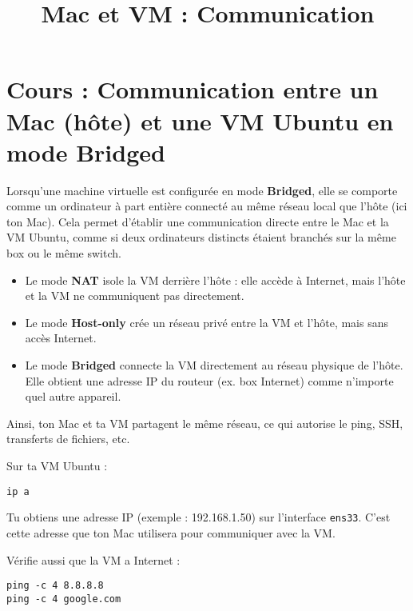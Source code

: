 \documentclass[11pt,a4paper]{article}
\title{Mac et VM : Communication }
\author{}
\date{}
\begin{document}
\maketitle









\section*{Cours : Communication entre un Mac (hôte) et une VM Ubuntu en mode Bridged}


\begin{tcolorbox}[title={Introduction}]
Lorsqu’une machine virtuelle est configurée en mode \textbf{Bridged}, elle se comporte comme un ordinateur à part entière connecté au même réseau local que l’hôte (ici ton Mac).  
Cela permet d’établir une communication directe entre le Mac et la VM Ubuntu, comme si deux ordinateurs distincts étaient branchés sur la même box ou le même switch.
\end{tcolorbox}

\begin{tcolorbox}[title={1. Comprendre le mode Bridged}]
\begin{itemize}
  \item Le mode \textbf{NAT} isole la VM derrière l’hôte : elle accède à Internet, mais l’hôte et la VM ne communiquent pas directement.  
  \item Le mode \textbf{Host-only} crée un réseau privé entre la VM et l’hôte, mais sans accès Internet.  
  \item Le mode \textbf{Bridged} connecte la VM directement au réseau physique de l’hôte. Elle obtient une adresse IP du routeur (ex. box Internet) comme n’importe quel autre appareil.  
\end{itemize}
Ainsi, ton Mac et ta VM partagent le même réseau, ce qui autorise le ping, SSH, transferts de fichiers, etc.
\end{tcolorbox}

\begin{tcolorbox}[title={2. Vérification de l’adresse IP de la VM}]
Sur ta VM Ubuntu :  
\begin{verbatim}
ip a
\end{verbatim}
Tu obtiens une adresse IP (exemple : 192.168.1.50) sur l’interface \texttt{ens33}.  
C’est cette adresse que ton Mac utilisera pour communiquer avec la VM.

Vérifie aussi que la VM a Internet :  
\begin{verbatim}
ping -c 4 8.8.8.8
ping -c 4 google.com
\end{verbatim}
\end{tcolorbox}
\end{document}
